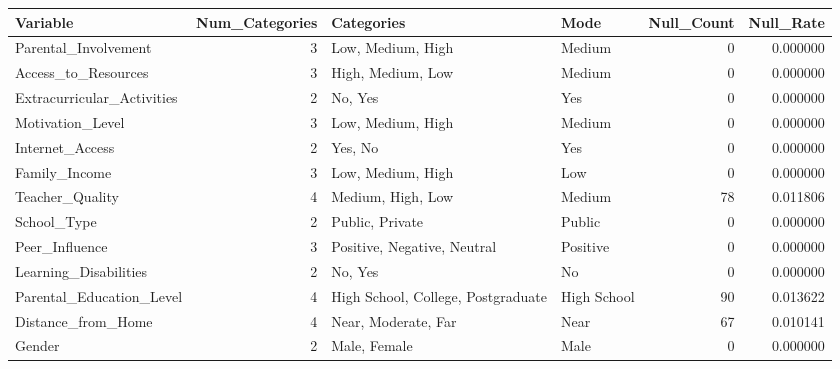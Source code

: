 \begin{tabular}{lrllrr}
\toprule
Variable & Num_Categories & Categories & Mode & Null_Count & Null_Rate \\
\midrule
Parental_Involvement & 3 & Low, Medium, High & Medium & 0 & 0.000000 \\
Access_to_Resources & 3 & High, Medium, Low & Medium & 0 & 0.000000 \\
Extracurricular_Activities & 2 & No, Yes & Yes & 0 & 0.000000 \\
Motivation_Level & 3 & Low, Medium, High & Medium & 0 & 0.000000 \\
Internet_Access & 2 & Yes, No & Yes & 0 & 0.000000 \\
Family_Income & 3 & Low, Medium, High & Low & 0 & 0.000000 \\
Teacher_Quality & 4 & Medium, High, Low & Medium & 78 & 0.011806 \\
School_Type & 2 & Public, Private & Public & 0 & 0.000000 \\
Peer_Influence & 3 & Positive, Negative, Neutral & Positive & 0 & 0.000000 \\
Learning_Disabilities & 2 & No, Yes & No & 0 & 0.000000 \\
Parental_Education_Level & 4 & High School, College, Postgraduate & High School & 90 & 0.013622 \\
Distance_from_Home & 4 & Near, Moderate, Far & Near & 67 & 0.010141 \\
Gender & 2 & Male, Female & Male & 0 & 0.000000 \\
\bottomrule
\end{tabular}

